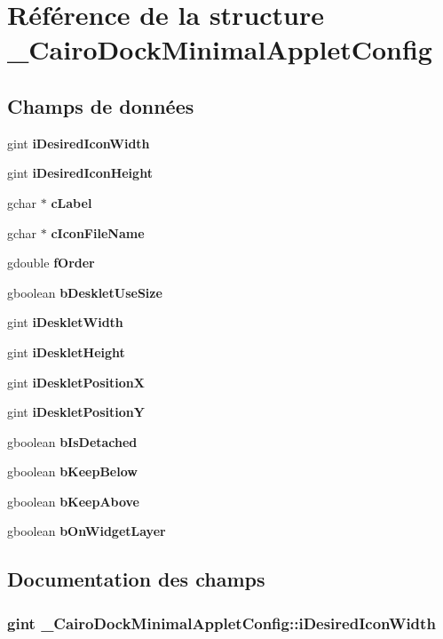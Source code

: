 \section{Référence de la structure \_\-CairoDockMinimalAppletConfig}
\label{struct__CairoDockMinimalAppletConfig}
\subsection*{Champs de données}
\begin{CompactItemize}
\item 
gint {\bf iDesiredIconWidth}
\item 
gint {\bf iDesiredIconHeight}
\item 
gchar $\ast$ {\bf cLabel}
\item 
gchar $\ast$ {\bf cIconFileName}
\item 
gdouble {\bf fOrder}
\item 
gboolean {\bf bDeskletUseSize}
\item 
gint {\bf iDeskletWidth}
\item 
gint {\bf iDeskletHeight}
\item 
gint {\bf iDeskletPositionX}
\item 
gint {\bf iDeskletPositionY}
\item 
gboolean {\bf bIsDetached}
\item 
gboolean {\bf bKeepBelow}
\item 
gboolean {\bf bKeepAbove}
\item 
gboolean {\bf bOnWidgetLayer}
\end{CompactItemize}


\subsection{Documentation des champs}
\subsubsection{\setlength{\rightskip}{0pt plus 5cm}gint {\bf \_\-CairoDockMinimalAppletConfig::iDesiredIconWidth}}\label{struct__CairoDockMinimalAppletConfig_3b8e7661edaeaa85b6bd4c480cb00d0e}


